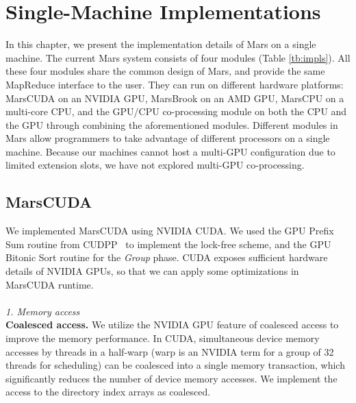 \chapter{Single-Machine Implementations}\label{sec-implement}
In this chapter, we present the implementation details of Mars on a
single machine. The current Mars system consists of four modules
(Table \ref{tb:impls}). All these four modules share the common
design of Mars, and provide the same MapReduce interface to the
user. They can run on different hardware platforms: MarsCUDA on
an NVIDIA GPU, MarsBrook on an AMD GPU, MarsCPU on a multi-core CPU,
and the GPU/CPU co-processing module on both the CPU and the GPU
through combining the aforementioned modules.  Different modules in
Mars allow programmers to take advantage of different processors on
a single machine. Because our machines cannot host a multi-GPU configuration due to limited extension slots, we have not explored multi-GPU co-processing.

\begin{table}[htb]
  \centering
\end{table}

\section{MarsCUDA}

We implemented MarsCUDA using NVIDIA CUDA. We used the GPU
Prefix Sum routine from CUDPP~\cite{CUDPP} to implement the lock-free scheme, and
the GPU Bitonic Sort routine for the {\em Group} phase.
CUDA exposes sufficient hardware details of NVIDIA GPUs, so that we can
apply some optimizations in MarsCUDA runtime.
\\\\
{\em 1. Memory access}
\\
{\bf Coalesced access.} We utilize the NVIDIA GPU feature of
coalesced access to improve the memory performance. In CUDA,
simultaneous device memory accesses by threads in a half-warp (warp is an NVIDIA term for a group of 32 threads for scheduling) can be
coalesced into a single memory transaction, which significantly
reduces the number of device memory accesses.
We implement the access to the directory index arrays as coalesced.

